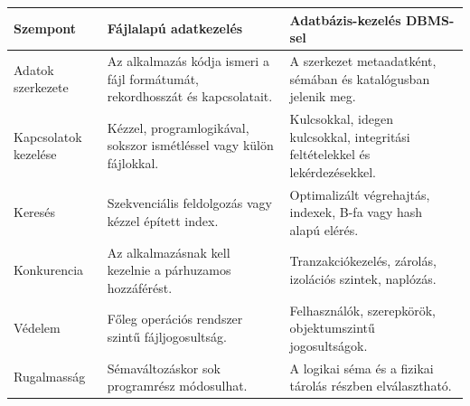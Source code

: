 \begin{tabularx}{\textwidth}{L{31mm}L{38mm}X}
\toprule
\textbf{Szempont} & \textbf{Fájlalapú adatkezelés} & \textbf{Adatbázis-kezelés DBMS-sel} \\
\midrule
Adatok szerkezete & Az alkalmazás kódja ismeri a fájl formátumát, rekordhosszát és kapcsolatait. & A szerkezet metaadatként, sémában és katalógusban jelenik meg. \\
Kapcsolatok kezelése & Kézzel, programlogikával, sokszor ismétléssel vagy külön fájlokkal. & Kulcsokkal, idegen kulcsokkal, integritási feltételekkel és lekérdezésekkel. \\
Keresés & Szekvenciális feldolgozás vagy kézzel épített index. & Optimalizált végrehajtás, indexek, B-fa vagy hash alapú elérés. \\
Konkurencia & Az alkalmazásnak kell kezelnie a párhuzamos hozzáférést. & Tranzakciókezelés, zárolás, izolációs szintek, naplózás. \\
Védelem & Főleg operációs rendszer szintű fájljogosultság. & Felhasználók, szerepkörök, objektumszintű jogosultságok. \\
Rugalmasság & Sémaváltozáskor sok programrész módosulhat. & A logikai séma és a fizikai tárolás részben elválasztható. \\
\bottomrule
\end{tabularx}
